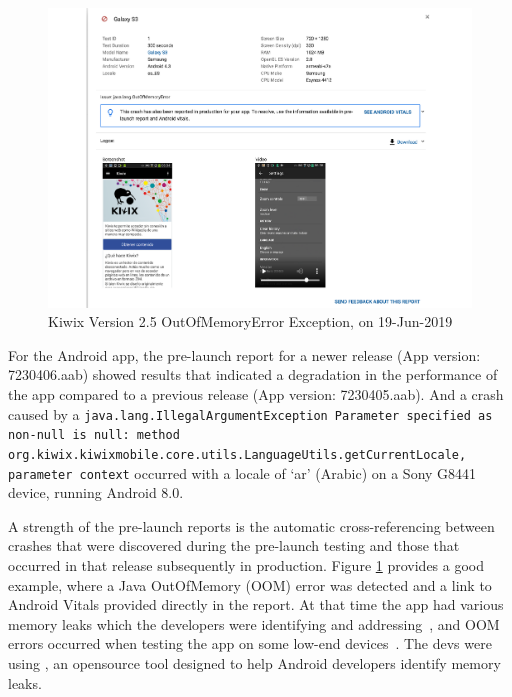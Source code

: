 \begin{figure}
    \centering
    \includegraphics[width=\linewidth]{images/google-play-console/Pre-launch_report_Galaxy_S3_OOM_Exception_Details_(19-Jun-2019).pdf}
    \caption[Kiwix Version 2.5 \texttt{OutOfMemoryError} Exception]{Kiwix Version 2.5 OutOfMemoryError Exception, on 19-Jun-2019}
    \label{fig:pre-launch-report-kiwix-oom-also-in-production}
\end{figure}

For the  Android app, the pre-launch report for a newer release (App version: 7230406.aab) showed results that indicated a degradation in the performance of the app compared to a previous release (App version: 7230405.aab). And a crash caused by a \texttt{java.lang.IllegalArgumentException Parameter specified as non-null is null: method org.kiwix.kiwixmobile.core.utils.LanguageUtils.getCurrentLocale, parameter context} occurred with a locale of `ar' (Arabic) on a Sony G8441 device, running Android 8.0.

A strength of the pre-launch reports is the automatic cross-referencing between crashes that were discovered during the pre-launch testing and those that occurred in that release subsequently in production. Figure \ref{fig:pre-launch-report-kiwix-oom-also-in-production} provides a good example, where a Java OutOfMemory (OOM) error was detected and a link to Android Vitals provided directly in the report. At that time the app had various memory leaks which the developers were identifying and addressing~, and OOM errors occurred when testing the app on some low-end devices~. The devs were using , an opensource tool designed to help Android developers identify memory leaks. 

